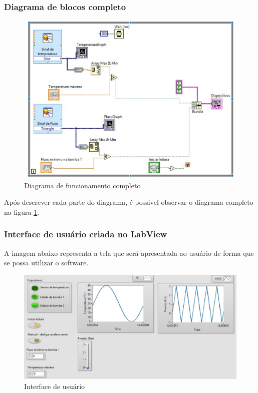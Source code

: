 \subsubsection{Diagrama de blocos completo}
\begin{figure}[!htb]\label{completo}                                                         
    \centering                                                                      
    \includegraphics[scale=0.4, keepaspectratio=true]{figuras/detalhado/completo.eps} 
    \caption{Diagrama de funcionamento completo}\label{dcompl}
 \end{figure}

Após descrever cada parte do diagrama, é possivel observar o diagrama completo na figura \ref{dcompl}.


\subsubsection{Interface de usuário criada no LabView}

A imagem abaixo representa a tela que será apresentada ao usuário de forma que se possa utilizar o software.

\begin{figure}[!htb]                                                               
    \centering                                                                      
    \includegraphics[scale=0.4, keepaspectratio=true]{figuras/detalhado/userinterface.eps} 
    \caption{Interface de usuário}
 \end{figure}
